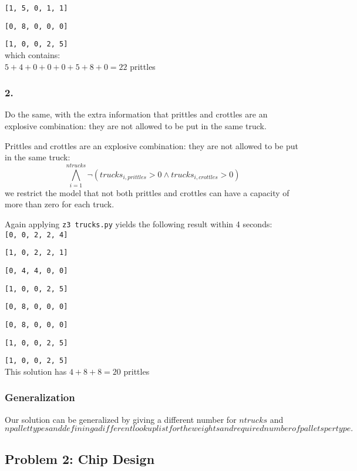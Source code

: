 \documentclass[12pt]{article}
\begin{document}
{\tt [1, 5, 0, 1, 1] }

{\tt [0, 8, 0, 0, 0] }

{\tt [1, 0, 0, 2, 5] } \\

which contains:\\
$ 5 + 4 + 0 + 0 + 0 + 5 + 8 + 0  = 22 $ prittles

\subsubsection*{2.}

Do the same, with the extra information that prittles and crottles are an explosive
combination: they are not allowed to be put in the same truck.

Prittles and crottles are an explosive combination: they are not allowed to be put in the same truck:
\[ \bigwedge_{i=1}^{ntrucks} \neg (trucks_{i,prittles}>0 \wedge trucks_{i,crottles}>0) \]
we restrict the model that not both prittles and crottles can have a capacity of more than zero for each truck.

Again applying {\tt z3 trucks.py} yields the following result within 4 seconds: \\

{\tt [0, 0, 2, 2, 4] }

{\tt [1, 0, 2, 2, 1] }

{\tt [0, 4, 4, 0, 0] }

{\tt [1, 0, 0, 2, 5] }

{\tt [0, 8, 0, 0, 0] }

{\tt [0, 8, 0, 0, 0] }

{\tt [1, 0, 0, 2, 5] }

{\tt [1, 0, 0, 2, 5] } \\

This solution has $ 4 + 8 + 8 = 20 $ prittles

\subsubsection*{Generalization}

Our solution can be generalized by giving a different number for $ntrucks$ and $npallettypes and defining a different lookup list for the weights and required number of pallets per type.$

\subsection*{Problem 2: Chip Design}
\end{document}
